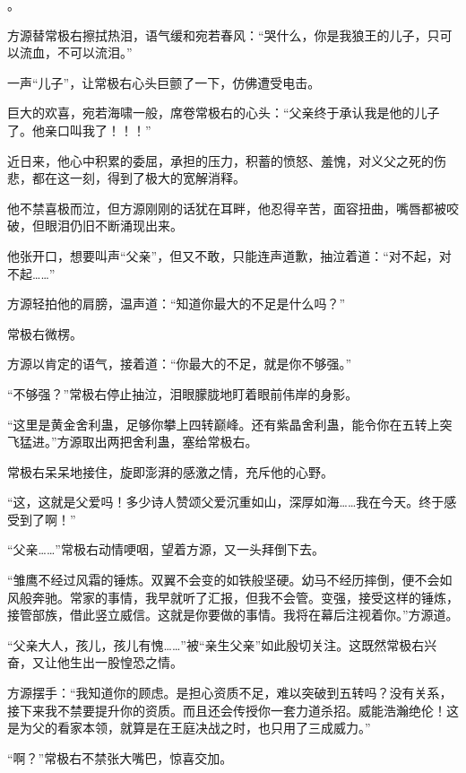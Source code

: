 
\begin{this_body}

。

方源替常极右擦拭热泪，语气缓和宛若春风：“哭什么，你是我狼王的儿子，只可以流血，不可以流泪。”

一声“儿子”，让常极右心头巨颤了一下，仿佛遭受电击。

巨大的欢喜，宛若海啸一般，席卷常极右的心头：“父亲终于承认我是他的儿子了。他亲口叫我了！！！”

近日来，他心中积累的委屈，承担的压力，积蓄的愤怒、羞愧，对义父之死的伤悲，都在这一刻，得到了极大的宽解消释。

他不禁喜极而泣，但方源刚刚的话犹在耳畔，他忍得辛苦，面容扭曲，嘴唇都被咬破，但眼泪仍旧不断涌现出来。

他张开口，想要叫声“父亲”，但又不敢，只能连声道歉，抽泣着道：“对不起，对不起……”

方源轻拍他的肩膀，温声道：“知道你最大的不足是什么吗？”

常极右微楞。

方源以肯定的语气，接着道：“你最大的不足，就是你不够强。”

“不够强？”常极右停止抽泣，泪眼朦胧地盯着眼前伟岸的身影。

“这里是黄金舍利蛊，足够你攀上四转巅峰。还有紫晶舍利蛊，能令你在五转上突飞猛进。”方源取出两把舍利蛊，塞给常极右。

常极右呆呆地接住，旋即澎湃的感激之情，充斥他的心野。

“这，这就是父爱吗！多少诗人赞颂父爱沉重如山，深厚如海……我在今天。终于感受到了啊！”

“父亲……”常极右动情哽咽，望着方源，又一头拜倒下去。

“雏鹰不经过风霜的锤炼。双翼不会变的如铁般坚硬。幼马不经历摔倒，便不会如风般奔驰。常家的事情，我早就听了汇报，但我不会管。变强，接受这样的锤炼，接管部族，借此竖立威信。这就是你要做的事情。我将在幕后注视着你。”方源道。

“父亲大人，孩儿，孩儿有愧……”被“亲生父亲”如此殷切关注。这既然常极右兴奋，又让他生出一股惶恐之情。

方源摆手：“我知道你的顾虑。是担心资质不足，难以突破到五转吗？没有关系，接下来我不禁要提升你的资质。而且还会传授你一套力道杀招。威能浩瀚绝伦！这是为父的看家本领，就算是在王庭决战之时，也只用了三成威力。”

“啊？”常极右不禁张大嘴巴，惊喜交加。


\end{this_body}
